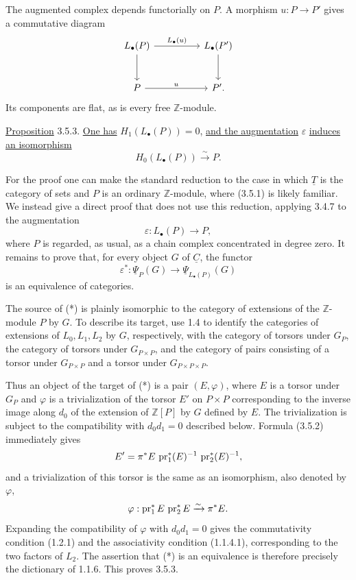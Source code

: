 The augmented complex depends functorially on $P$.  A morphism
$u:P\longrightarrow P'$ gives a commutative diagram
\[
\begin{tikzcd}[column sep=huge,row sep=large]
 L_\bullet(P)\arrow[r,"L_\bullet(u)"]\arrow[d]
 &L_\bullet(P')\arrow[d]\\
 P\arrow[r,"u"]&P'.
\end{tikzcd}
\]
Its components are flat, as is every free $\mathbb Z$-module.

\underline{Proposition} 3.5.3. \underline{One has}
$H_1(L_\bullet(P))=0$, \underline{and the augmentation}
$\varepsilon$ \underline{induces an isomorphism}
\[
 H_0(L_\bullet(P))\xrightarrow{\sim}P.
\]

For the proof one can make the standard reduction to the case in
which $\underline T$ is the category of sets and $P$ is an ordinary
$\mathbb Z$-module, where (3.5.1) is likely familiar.  We instead
give a direct proof that does not use this reduction, applying 3.4.7
to the augmentation
\[
 \varepsilon:L_\bullet(P)\longrightarrow P,
\]
where $P$ is regarded, as usual, as a chain complex concentrated in
degree zero.  It remains to prove that, for every object $G$ of
$\underline C$, the functor
\begin{equation}\tag{*}
 \varepsilon^*:\underline\Psi_P(G)\longrightarrow
 \underline\Psi_{L_\bullet(P)}(G)
\end{equation}
is an equivalence of categories.

The source of (*) is plainly isomorphic to the category of
extensions of the $\mathbb Z$-module $P$ by $G$.  To describe its
target, use 1.4 to identify the categories of extensions of
$L_0,L_1,L_2$ by $G$, respectively, with the category of torsors
under $G_P$, the category of torsors under $G_{P\times P}$, and the
category of pairs consisting of a torsor under $G_{P\times P}$ and
a torsor under $G_{P\times P\times P}$.

Thus an object of the target of (*) is a pair $(E,\varphi)$, where
$E$ is a torsor under $G_P$ and $\varphi$ is a trivialization of the
torsor $E'$ on $P\times P$ corresponding to the inverse image along
$d_0$ of the extension of $\mathbb Z[P]$ by $G$ defined by $E$.
The trivialization is subject to the compatibility with
$d_0d_1=0$ described below.  Formula (3.5.2) immediately gives
\[
 E'=\pi^*E\,\operatorname{pr}_1^*(E)^{-1}\,\operatorname{pr}_2^*(E)^{-1},
\]
and a trivialization of this torsor is the same as an isomorphism,
also denoted by $\varphi$,
\[
 \varphi:\operatorname{pr}_1^*E\,\operatorname{pr}_2^*E\xrightarrow{\sim}\pi^*E.
\]
Expanding the compatibility of $\varphi$ with $d_0d_1=0$ gives the
commutativity condition (1.2.1) and the associativity condition
(1.1.4.1), corresponding to the two factors of $L_2$.  The assertion
that (*) is an equivalence is therefore precisely the dictionary of
1.1.6.  This proves 3.5.3.

